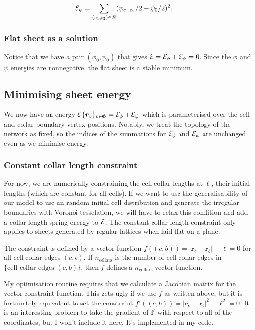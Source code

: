 \begin{align*}
    \mathcal{E}_\psi &= \sum_{(c_1, c_2) \in E} (\psi_{c_1, c_2} / 2 - \psi_0/2)^2.
\end{align*}

\subsubsection{Flat sheet as a solution} \label{subsubsec:flat}

Notice that we have a pair $(\phi_0, \psi_0)$ that gives $\mathcal{E} = \mathcal{E}_\phi + \mathcal{E}_\psi = 0$. Since the $\phi$ and $\psi$ energies are nonnegative, the flat sheet is a stable minimum. 

\subsection{Minimising sheet energy}

We now have an energy $\mathcal{E}\{ \bm{r}_v \}_{v \in \mathfrak{G}} = \mathcal{E}_\phi + \mathcal{E}_\psi$ which is parameterised over the cell and collar boundary vertex positions. Notably, we treat the topology of the network as fixed, so the indices of the summations for $\mathcal{E}_\phi$ and $\mathcal{E}_\psi$ are unchanged even as we minimise energy.

\subsubsection{Constant collar length constraint}

For now, we are numerically constraining the cell-collar lengths at $\ell$, their initial lengths (which are constant for all cells). If we want to use the generalisability of our model to use an random initial cell distribution and generate the irregular boundaries with Voronoi tesselation, we will have to relax this condition and add a collar length spring energy to $\mathcal{E}$. The constant collar length constraint only applies to sheets generated by regular lattices when laid flat on a plane.

The constraint is defined by a vector function $f((c, b)) = |\bm{r}_c - \bm{r}_b| - \ell = 0$ for all cell-collar edges $(c, b)$. If $n_{\text{collars}}$ is the number of cell-collar edges in $\{\text{cell-collar edges }(c,b) \}$, then $f$ defines a $n_{\text{collars}}$-vector function. 

My optimisation routine requires that we calculate a Jacobian matrix for the vector constraint function. This gets ugly if we use $f$ as written above, but it is fortunately equivalent to set the constraint $f'((c, b)) = |\bm{r}_c - \bm{r}_b|^2 - \ell^2 = 0$. It is an interesting problem to take the gradient of $\bm{f'}$ with respect to all of the coordinates, but I won't include it here. It's implemented in my code.

